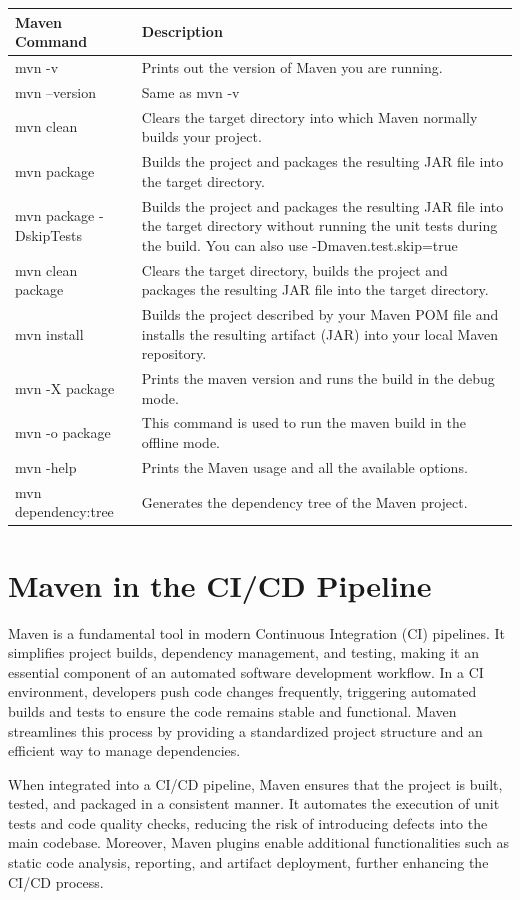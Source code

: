 \begin{tabularx}{\textwidth}{ |l|X| } 
\hline
\textbf{Maven Command}	& \textbf{Description} \\
\hline
mvn -v	& Prints out the version of Maven you are running.\\ 
mvn --version & Same as mvn -v\\
mvn clean	& Clears the target directory into which Maven normally builds your project.\\
mvn package & Builds the project and packages the resulting JAR file into the target directory.\\
mvn package -DskipTests &	Builds the project and packages the resulting JAR file into the target directory without running the unit tests during the build. You can also use -Dmaven.test.skip=true\\
mvn clean package &	Clears the target directory,  builds the project and packages the resulting JAR file into the target directory.\\
mvn install & Builds the project described by your Maven POM file and installs the resulting artifact (JAR) into your local Maven repository.\\
mvn -X package & Prints the maven version and runs the build in the debug mode. \\
mvn -o package & This command is used to run the maven build in the offline mode.\\
mvn -help & Prints the Maven usage and all the available options.\\
mvn dependency:tree & Generates the dependency tree of the Maven project.\\
\hline
\end{tabularx}

\section{Maven in the CI/CD Pipeline}

Maven is a fundamental tool in modern Continuous Integration (CI) pipelines. It simplifies project builds, dependency management, and testing, making it an essential component of an automated software development workflow. In a CI environment, developers push code changes frequently, triggering automated builds and tests to ensure the code remains stable and functional. Maven streamlines this process by providing a standardized project structure and an efficient way to manage dependencies.

When integrated into a CI/CD pipeline, Maven ensures that the project is built, tested, and packaged in a consistent manner. It automates the execution of unit tests and code quality checks, reducing the risk of introducing defects into the main codebase. Moreover, Maven plugins enable additional functionalities such as static code analysis, reporting, and artifact deployment, further enhancing the CI/CD process.

